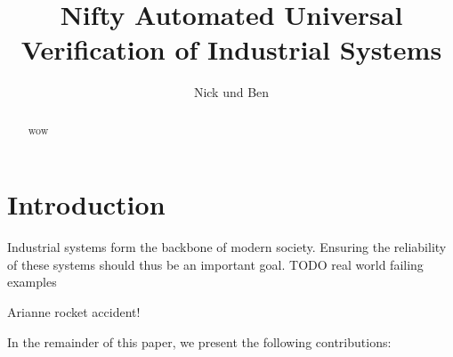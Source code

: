 \documentclass{article}
\begin{document}
\title{Nifty Automated Universal Verification of Industrial Systems}
\author{Nick und Ben}


\maketitle

\begin{abstract}
    wow
\end{abstract}


\section{Introduction}

Industrial systems form the backbone of modern society. Ensuring the reliability of these systems should thus be an important goal. 
TODO real world failing examples

Arianne rocket accident!

In the remainder of this paper, we present the following contributions:
\end{document}
